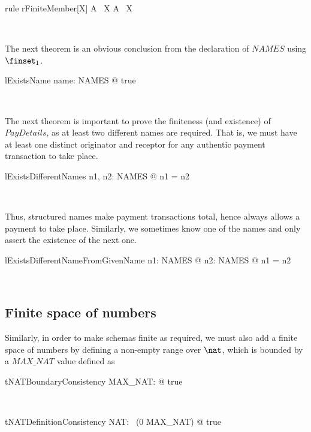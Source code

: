 \begin{LToolkit}
\begin{theorem}{rule rFiniteMember}[X]
    A \in \finset~X \implies A \in \power~X
\end{theorem}~\end{LToolkit}

The next theorem is an obvious conclusion from the declaration of $NAMES$ using $\finset_1$.
%
\begin{LNewLemma}
\begin{theorem}{lExistsName}
    \exists name: NAMES @ true
\end{theorem}~\end{LNewLemma}

The next theorem is important to prove the finiteness (and existence)
of $PayDetails$, as at least two different names are required. That is,
we must have at least one distinct originator and receptor for any
authentic payment transaction to take place.
%
\begin{LNewLemma}
\begin{theorem}{lExistsDifferentNames}
    \exists n1, n2: NAMES @ \lnot n1 = n2
\end{theorem}~\end{LNewLemma}
%
Thus, structured names make payment transactions total, hence
always allows a payment to take place. Similarly, we sometimes know
one of the names and only assert the existence of the next one.

\begin{LNewLemma}
\begin{theorem}{lExistsDifferentNameFromGivenName}
    \forall n1: NAMES @ \exists n2: NAMES @ \lnot n1 = n2
\end{theorem}~\end{LNewLemma}

\subsection{Finite space of numbers}\label{ch3.NAT}

Similarly, in order to make schemas finite as required,
we must also add a finite space of numbers by defining a
non-empty range over $\nat$, which is bounded by a $MAX\_NAT$
value defined as
%
\begin{LConsistency}
\begin{theorem}{tNATBoundaryConsistency}
   \exists MAX\_NAT: \nat @ true
\end{theorem}~\end{LConsistency}
%
\begin{LConsistency}
\begin{theorem}{tNATDefinitionConsistency}
   \exists NAT: \power~(0 \upto MAX\_NAT) @ true
\end{theorem}~\end{LConsistency}

